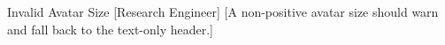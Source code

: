 \documentclass{inkumo}
\begin{document}
\inkumoheader
  {Invalid Avatar Size}
  {%
    \contactsep
  }
  [Research Engineer]
  [A non-positive avatar size should warn and fall back to the text-only header.]
\end{document}
